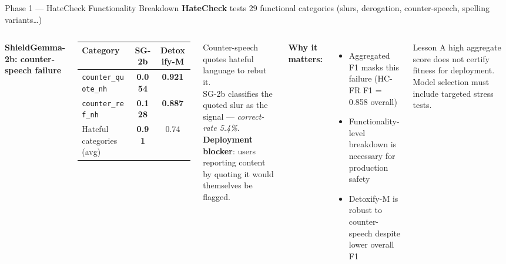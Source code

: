 \documentclass[aspectratio=169, 12pt]{beamer}
\newcommand{\good}[1]{\textcolor{okgreen}{\textbf{#1}}}
\newcommand{\bad}[1]{\textcolor{warnred}{\textbf{#1}}}
\begin{document}
\begin{frame}[shrink=25]{Phase 1 — HateCheck Functionality Breakdown}
  \textbf{HateCheck} tests 29 functional categories (slurs, derogation, counter-speech, spelling variants…)\\[4pt]
  \begin{columns}[T]
      \textbf{ShieldGemma-2b: counter-speech failure}\\[4pt]
      \small
      \begin{tabular}{lcc}
        \toprule
        \textbf{Category} & \textbf{SG-2b} & \textbf{Detoxify-M} \\
        \midrule
        \texttt{counter\_quote\_nh} & \bad{0.054} & \good{0.921} \\
        \texttt{counter\_ref\_nh}   & \bad{0.128} & \good{0.887} \\
        \midrule
        Hateful categories (avg)    & \good{0.91} & 0.74 \\
        \bottomrule
      \end{tabular}
      \vspace{4pt}

      Counter-speech quotes hateful language to rebut it.\\
      SG-2b classifies the quoted slur as the signal — \emph{correct-rate 5.4\%}.\\[4pt]
      \textbf{Deployment blocker}: users reporting content by quoting it would themselves be flagged.

      \textbf{Why it matters:}
      \begin{itemize}
        \item Aggregated F1 masks this failure (HC-FR F1 = 0.858 overall)
        \item Functionality-level breakdown is necessary for production safety
        \item Detoxify-M is robust to counter-speech despite lower overall F1
      \end{itemize}
      \vspace{6pt}
      \begin{alertblock}{Lesson}
        \small A high aggregate score does not certify fitness for deployment.
        Model selection must include targeted stress tests.
      \end{alertblock}
  \end{columns}
\end{frame}
\end{document}
